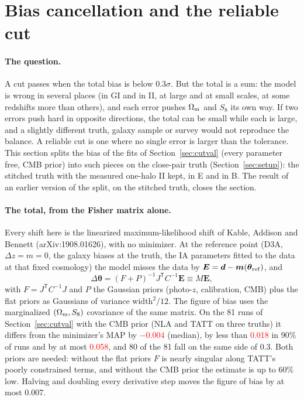\documentclass[11pt]{article}
\newcommand{\Om}{\Omega_{\rm m}}
\newcommand{\T}{^{\mathsf{T}}}
\newcommand{\bvec}[1]{\boldsymbol{#1}}
\newif\ifnumbersfinal
\newcommand{\refresh}[1]{\ifnumbersfinal#1\else\textcolor{red}{#1}\fi}
\newcommand{\FMmed}{\refresh{$-0.004$}}
\newcommand{\FMninety}{\refresh{0.018}}
\newcommand{\FMmax}{\refresh{0.058}}
\newcommand{\Tol}{0.3}
\begin{document}
\section{Bias cancellation and the reliable cut}
\label{sec:cancel}

\paragraph{The question.}
A cut passes when the total bias is below \Tol$\sigma$. But the total is a
sum: the model is wrong in several places (in GI and in II, at large and at
small scales, at some redshifts more than others), and each error pushes
$\Om$ and $S_8$ its own way. If two errors push hard in opposite directions,
the total can be small while each is large, and a slightly different truth,
galaxy sample or survey would not reproduce the balance. A reliable cut is
one where no single error is larger than the tolerance. This section
splits the bias of the fits of Section~\ref{sec:cutval} (every parameter
free, CMB prior) into such pieces on the close-pair truth
(Section~\ref{sec:setup}): the stitched truth with the measured one-halo II
kept, in E and in B. The result of an earlier version of the split, on the
stitched truth, closes the section.

\paragraph{The total, from the Fisher matrix alone.}
Every shift here is the linearized maximum-likelihood shift of Kable,
Addison and Bennett (arXiv:1908.01626), with no minimizer. At the reference
point (D3A, $\Delta z = m = 0$, the galaxy biases at the truth, the IA
parameters fitted to the data at that fixed cosmology) the model misses the
data by $\bvec E = \bvec d - \bvec m(\bvec\theta_{\rm ref})$, and
\begin{equation}
  \Delta\bvec\theta = (F + P)^{-1} J\T C^{-1} \bvec E \equiv M\bvec E,
  \label{eq:fishershift}
\end{equation}
with $F = J\T C^{-1} J$ and $P$ the Gaussian priors (photo-$z$,
calibration, CMB) plus the flat priors as Gaussians of variance
width$^2/12$. The figure of bias uses the marginalized $(\Om, S_8)$
covariance of the same matrix. On the 81 runs of Section~\ref{sec:cutval}
with the CMB prior (NLA and TATT on three truths) it differs from the
minimizer's MAP by \FMmed{} (median), by less than \FMninety{} in 90\% of
runs and by at most \FMmax, and 80 of the 81 fall on the same side of \Tol.
Both priors are needed: without the flat priors $F$ is nearly singular along
TATT's poorly constrained terms, and without the CMB prior the estimate is
up to 60\% low. Halving and doubling every derivative step moves the figure
of bias by at most 0.007.
\end{document}
